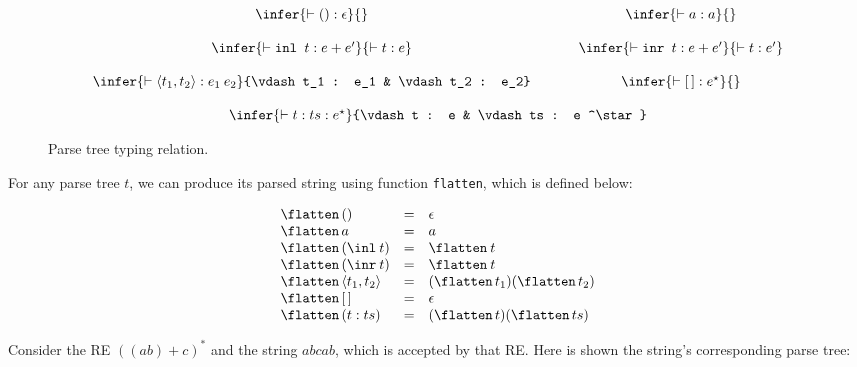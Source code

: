 \begin{figure}[h]
   \[ 
       \begin{array}{ccc}
         \infer{\vdash () : \epsilon}{} & \hspace{.5cm} & \infer{\vdash a : a}{}\\
         \\
         \infer{\vdash \texttt{inl }t : e + e'}{\vdash t : e}  & & 
         \infer{\vdash \texttt{inr }t : e + e'}{\vdash t : e'} \\ 
         \\
         \infer{\vdash \langle t_1, t_2 \rangle : e_1\:e_2}
               {\vdash t_1 : e_1 & \vdash t_2 : e_2}   & & 
         \infer{\vdash [\,] : e^\star}{} \\ \\
         \multicolumn{3}{c}{
           \infer{\vdash t : ts : e ^\star}
                 {\vdash t : e & \vdash ts : e ^\star}
         }
       \end{array}
   \]
   \caption{Parse tree typing relation.}
   \label{figure:parsetreetyping}
\end{figure}



For any parse tree $t$, we can produce its parsed string using function 
\texttt{flatten}, which is defined below:

\[
\begin{array}{lcl}
   \flatten\,() & = & \epsilon\\
   \flatten\,a  & = & a \\
   \flatten\,(\inl\:t) & = & \flatten\:t\\
   \flatten\,(\inr\:t) & = & \flatten\:t\\
   \flatten\,\langle t_1, t_2 \rangle & = & (\flatten\,t_1)(\flatten\,t_2)\\
   \flatten\,[\,] & = & \epsilon\\
   \flatten\,(t:ts) & = & (\flatten\,t)(\flatten\,ts)
\end{array}
\]                                                                                                                                


\begin{Example}
\label{example:parsetree}
Consider the RE $((ab)+c)^*$ and the string $abcab$, which is accepted by that RE. 
Here is shown the string's corresponding parse tree:

\begin{center}
\end{center}

\end{Example}

